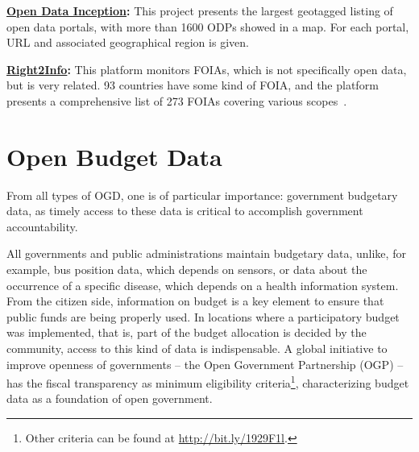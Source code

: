 \textbf{\href{http://opendatainception.io/}{Open Data Inception}:} This project presents the largest geotagged listing of open data portals, with more than 1600 ODPs showed in a map. For each portal, URL and associated geographical region is given.

\textbf{\href{http://right2info.org}{Right2Info}:} This platform monitors FOIAs, which is not specifically open data, but is very related. 93 countries have some kind of FOIA, and the platform presents a comprehensive list of 273 FOIAs covering various scopes~\cite{Vleugels2012}.

\section{Open Budget Data}
\label{sec:openbudget}

From all types of OGD, one is of particular importance: government budgetary data, as timely access to these data is critical to accomplish government accountability.

All governments and public administrations maintain budgetary data, unlike, for example, bus position data, which depends on sensors, or data about the occurrence of a specific disease, which depends on a health information system.
From the citizen side, information on budget is a key element to ensure that public funds are being properly used.
In locations where a participatory budget~\cite{Mkude2014} was implemented, that is, part of the budget allocation is decided by the community, access to this kind of data is indispensable.
A global initiative to improve openness of governments -- the Open Government Partnership (OGP) -- has the fiscal transparency as minimum eligibility criteria\footnote{Other criteria can be found at \url{http://bit.ly/1929F1l}.}, characterizing budget data as a foundation of open government.


